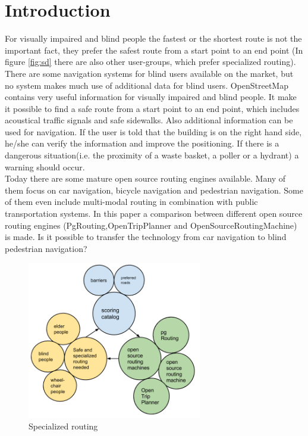 \documentclass{sig-alternate}
\begin{document}

\section{Introduction}
For visually impaired and blind people the fastest or the shortest route is not the important fact, they prefer the safest route from a start point to an end point (In figure \ref{fig:sd} there are also other user-groups, which prefer specialized routing). There are some navigation systems for blind users available on the market, but no system makes much use of additional data for blind users. 
OpenStreetMap contains very useful information for visually impaired and blind people. It make it possible to find a safe route from a start point to an end point, which includes acoustical traffic signals and safe sidewalks. Also additional information can be used for navigation. If the user is told that the building is on the right hand side, he/she can verify the information and improve the positioning. If there is a dangerous situation(i.e. the proximity of a waste basket, a poller or a hydrant) a warning should occur. \\ 
Today there are some mature open source routing engines available. Many of them focus on car navigation, bicycle navigation and pedestrian navigation. Some of them even include multi-modal routing in combination with public transportation systems. In this paper a comparison between different open source routing engines (PgRouting,OpenTripPlanner and OpenSourceRoutingMachine) is made. Is it possible to transfer the technology from car navigation to blind pedestrian navigation?

\begin{figure}
\centering
\includegraphics[width=3in]{PONS-Routing-Overview.png}
\caption{Specialized routing}
\label{fig:pons}
\end{figure}
\end{document}

